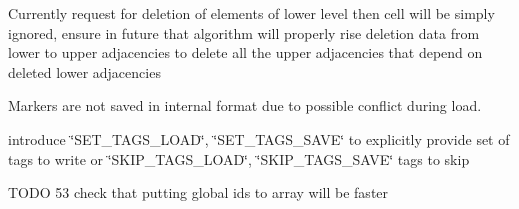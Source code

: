 \begin{DoxyRefList}
\begin{DoxyItemize}
\end{DoxyItemize}
\item[\label{todo__todo000010}%
\hypertarget{todo__todo000010}{}%
Member \hyperlink{classINMOST_1_1Mesh_a5cb95f1e8d6b7987496fc8276c86cf3a}{I\-N\-M\-O\-S\-T\-:\-:Mesh\-:\-:Remove\-Ghost\-Elements} (const Handle\-Type $\ast$ghost, enumerator num)]
\begin{DoxyEnumerate}
\item Currently request for deletion of elements of lower level then cell will be simply ignored, ensure in future that algorithm will properly rise deletion data from lower to upper adjacencies to delete all the upper adjacencies that depend on deleted lower adjacencies  
\end{DoxyEnumerate}
\item[\label{todo__todo000018}%
\hypertarget{todo__todo000018}{}%
Member \hyperlink{classINMOST_1_1Mesh_ac12ba58210b79c61e64a74c389cd11f6}{I\-N\-M\-O\-S\-T\-:\-:Mesh\-:\-:Save} (std\-::string File)]
\begin{DoxyEnumerate}
\item Markers are not saved in internal format due to possible conflict during load.  
\end{DoxyEnumerate}
\item[\label{todo__todo000016}%
\hypertarget{todo__todo000016}{}%
Member \hyperlink{classINMOST_1_1Mesh_a07c75e9dee2c400225a6095e45489ac1}{I\-N\-M\-O\-S\-T\-:\-:Mesh\-:\-:Set\-File\-Option} (std\-::string, std\-::string)]introduce \char`\"{}\-S\-E\-T\-\_\-\-T\-A\-G\-S\-\_\-\-L\-O\-A\-D\char`\"{}, \char`\"{}\-S\-E\-T\-\_\-\-T\-A\-G\-S\-\_\-\-S\-A\-V\-E\char`\"{} to explicitly provide set of tags to write or \char`\"{}\-S\-K\-I\-P\-\_\-\-T\-A\-G\-S\-\_\-\-L\-O\-A\-D\char`\"{}, \char`\"{}\-S\-K\-I\-P\-\_\-\-T\-A\-G\-S\-\_\-\-S\-A\-V\-E\char`\"{} tags to skip  
\item[\label{todo__todo000022}%
\hypertarget{todo__todo000022}{}%
Member \hyperlink{classINMOST_1_1Mesh_a9f8cfa72de874bd9a17fb0067ac8d515}{I\-N\-M\-O\-S\-T\-:\-:Mesh\-:\-:Sort\-By\-Global\-I\-D} (Handle\-Type $\ast$h, enumerator num)]T\-O\-D\-O 53 check that putting global ids to array will be faster 
\end{DoxyRefList}
